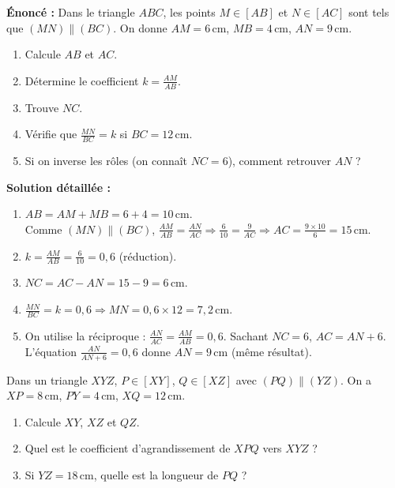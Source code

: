 \documentclass[11pt]{article}
\begin{document}
\begin{exoresolu}
\textbf{Énoncé :} Dans le triangle $ABC$, les points $M\in[AB]$ et $N\in[AC]$ sont tels que $(MN)\parallel(BC)$. On donne $AM=6\,\text{cm}$, $MB=4\,\text{cm}$, $AN=9\,\text{cm}$. 
\begin{enumerate}
\item Calcule $AB$ et $AC$.
\item Détermine le coefficient $k=\frac{AM}{AB}$.
\item Trouve $NC$.
\item Vérifie que $\frac{MN}{BC}=k$ si $BC=12\,\text{cm}$.
\item Si on inverse les rôles (on connaît $NC=6$), comment retrouver $AN$ ?
\end{enumerate}

\tcblower

\textbf{Solution détaillée :}
\begin{enumerate}
\item $AB = AM+MB = 6+4 = 10\,\text{cm}$. \\
      Comme $(MN)\parallel(BC)$, $\frac{AM}{AB}=\frac{AN}{AC}\Rightarrow \frac{6}{10}=\frac{9}{AC}\Rightarrow AC = \frac{9\times10}{6}=15\,\text{cm}$.
\item $k = \frac{AM}{AB} = \frac{6}{10}=0,6$ (réduction).
\item $NC = AC-AN = 15-9 = 6\,\text{cm}$.
\item $\frac{MN}{BC}=k=0,6 \Rightarrow MN = 0,6\times12 = 7,2\,\text{cm}$.
\item On utilise la réciproque : $\frac{AN}{AC}=\frac{AM}{AB}=0,6$. Sachant $NC=6$, $AC=AN+6$. L'équation $\frac{AN}{AN+6}=0,6$ donne $AN=9\,\text{cm}$ (même résultat).
\end{enumerate}
\end{exoresolu}

\begin{exercice}
Dans un triangle $XYZ$, $P\in[XY]$, $Q\in[XZ]$ avec $(PQ)\parallel(YZ)$. On a $XP=8\,\text{cm}$, $PY=4\,\text{cm}$, $XQ=12\,\text{cm}$. 
\begin{enumerate}
\item Calcule $XY$, $XZ$ et $QZ$.
\item Quel est le coefficient d'agrandissement de $XPQ$ vers $XYZ$ ?
\item Si $YZ=18\,\text{cm}$, quelle est la longueur de $PQ$ ?
\end{enumerate}
\end{exercice}
\end{document}
